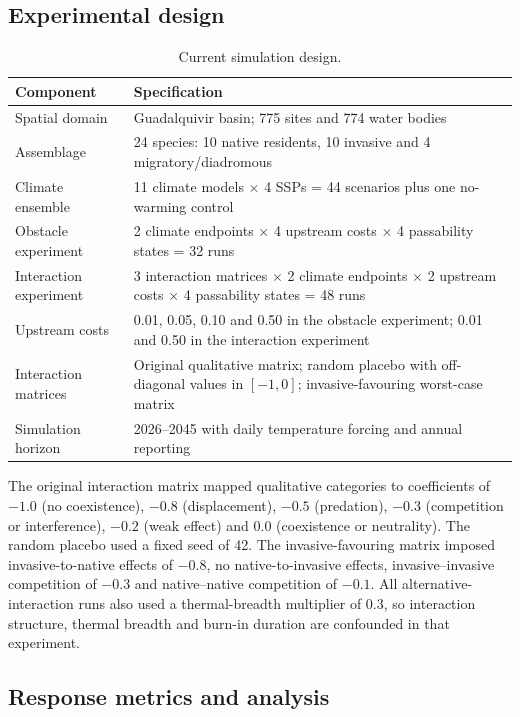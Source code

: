 \documentclass[11pt,a4paper]{article}
\begin{document}
\subsection{Experimental design}

\begin{table}[H]
\centering
\caption{Current simulation design.}
\small
\begin{tabularx}{\textwidth}{>{\raggedright\arraybackslash}p{}Y}
\toprule
Component & Specification \\
\midrule
Spatial domain & Guadalquivir basin; 775 sites and 774 water bodies \\
Assemblage & 24 species: 10 native residents, 10 invasive and 4 migratory/diadromous \\
Climate ensemble & 11 climate models $\times$ 4 SSPs = 44 scenarios plus one no-warming control \\
Obstacle experiment & 2 climate endpoints $\times$ 4 upstream costs $\times$ 4 passability states = 32 runs \\
Interaction experiment & 3 interaction matrices $\times$ 2 climate endpoints $\times$ 2 upstream costs $\times$ 4 passability states = 48 runs \\
Upstream costs & 0.01, 0.05, 0.10 and 0.50 in the obstacle experiment; 0.01 and 0.50 in the interaction experiment \\
Interaction matrices & Original qualitative matrix; random placebo with off-diagonal values in $[-1,0]$; invasive-favouring worst-case matrix \\
Simulation horizon & 2026--2045 with daily temperature forcing and annual reporting \\
\bottomrule
\end{tabularx}
\end{table}

The original interaction matrix mapped qualitative categories to coefficients of $-1.0$ (no coexistence), $-0.8$ (displacement), $-0.5$ (predation), $-0.3$ (competition or interference), $-0.2$ (weak effect) and $0.0$ (coexistence or neutrality). The random placebo used a fixed seed of 42. The invasive-favouring matrix imposed invasive-to-native effects of $-0.8$, no native-to-invasive effects, invasive--invasive competition of $-0.3$ and native--native competition of $-0.1$. All alternative-interaction runs also used a thermal-breadth multiplier of 0.3, so interaction structure, thermal breadth and burn-in duration are confounded in that experiment.

\subsection{Response metrics and analysis}
\end{document}
